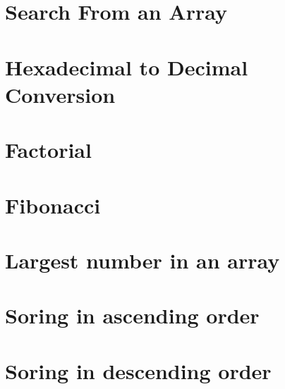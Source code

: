 \documentclass[12pt]{report}
\begin{document}
  \chapter{ Search From an Array}
  
  
  \chapter{ Hexadecimal to Decimal Conversion}
  
  
  \chapter{ Factorial}
  
  
  \chapter{ Fibonacci}
  
  
  \chapter{ Largest number in an array}
  
  
  \chapter{ Soring in ascending order}
  
  
  \chapter{ Soring in descending order}
  
  
 
 
  
\end{document}

